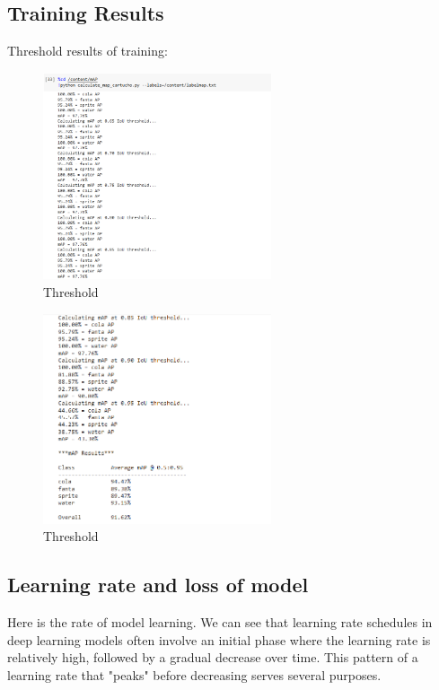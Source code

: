 \subsection{Training Results}
Threshold results of training:
\begin{figure}[!htbp]
    \centering
    \includegraphics[width=0.6\textwidth]{Imgs/threshold1.PNG}
    \caption{\label{fig:threshold}Threshold }
\end{figure}
\begin{figure}[!htbp]
    \centering
    \includegraphics[width=0.6\textwidth]{Imgs/threshold2.PNG}
    \caption{\label{fig:threshold}Threshold }
\end{figure}

\subsection{Learning rate and loss of model}
Here is the rate of model learning. We can see that learning rate schedules in deep learning models often involve an initial phase where the learning rate is relatively high, followed by a gradual decrease over time. This pattern of a learning rate that "peaks" before decreasing serves several purposes.

